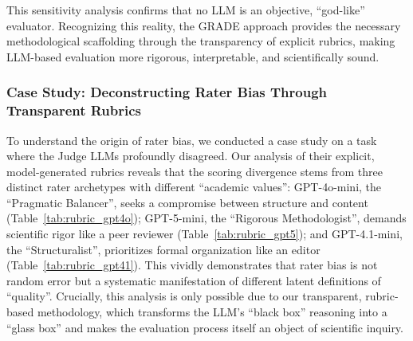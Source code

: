 \documentclass[11pt]{article}
\begin{document}
This sensitivity analysis confirms that no LLM is an objective, ``god-like'' evaluator. Recognizing this reality, the GRADE approach provides the necessary methodological scaffolding through the transparency of explicit rubrics, making LLM-based evaluation more rigorous, interpretable, and scientifically sound.

\subsubsection{Case Study: Deconstructing Rater Bias Through Transparent Rubrics}
\label{sec:case_study_rater_bias}

To understand the origin of rater bias, we conducted a case study on a task where the Judge LLMs profoundly disagreed. Our analysis of their explicit, model-generated rubrics reveals that the scoring divergence stems from three distinct rater archetypes with different ``academic values'': GPT-4o-mini, the ``Pragmatic Balancer'', seeks a compromise between structure and content (Table~\ref{tab:rubric_gpt4o}); GPT-5-mini, the ``Rigorous Methodologist'', demands scientific rigor like a peer reviewer (Table~\ref{tab:rubric_gpt5}); and GPT-4.1-mini, the ``Structuralist'', prioritizes formal organization like an editor (Table~\ref{tab:rubric_gpt41}). This vividly demonstrates that rater bias is not random error but a systematic manifestation of different latent definitions of ``quality''. Crucially, this analysis is only possible due to our transparent, rubric-based methodology, which transforms the LLM's ``black box'' reasoning into a ``glass box'' and makes the evaluation process itself an object of scientific inquiry.
\end{document}
